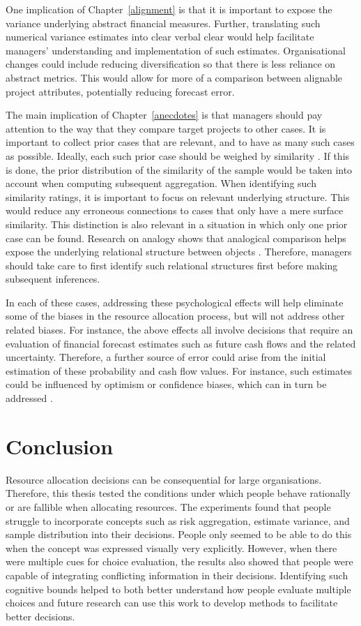 \documentclass[a4paper, nobind, dvipsnames]{templates/ociamthesis}
\theoremstyle{definition}
\theoremstyle{definition}
\theoremstyle{definition}
\theoremstyle{definition}
\theoremstyle{remark}
\begin{document}
One implication of Chapter~\ref{alignment} is that it is important to expose
the variance underlying abstract financial measures. Further, translating such
numerical variance estimates into clear verbal clear would help facilitate
managers' understanding and implementation of such estimates. Organisational
changes could include reducing diversification so that there is less reliance on
abstract metrics. This would allow for more of a comparison between alignable
project attributes, potentially reducing forecast error.

The main implication of Chapter~\ref{anecdotes} is that managers should pay
attention to the way that they compare target projects to other cases. It is
important to collect prior cases that are relevant, and to have as many such
cases as possible. Ideally, each such prior case should be weighed by similarity
\autocite{lovallo2012}. If this is done, the prior distribution of the similarity of the
sample would be taken into account when computing subsequent aggregation. When
identifying such similarity ratings, it is important to focus on relevant
underlying structure. This would reduce any erroneous connections to cases that
only have a mere surface similarity. This distinction is also relevant in a
situation in which only one prior case can be found. Research on analogy shows
that analogical comparison helps expose the underlying relational structure
between objects \autocites[e.g.,][]{kurtz2013,markman1993}. Therefore, managers should
take care to first identify such relational structures first before making
subsequent inferences.

In each of these cases, addressing these psychological effects will help
eliminate some of the biases in the resource allocation process, but will not
address other related biases. For instance, the above effects all involve
decisions that require an evaluation of financial forecast estimates such as
future cash flows and the related uncertainty. Therefore, a further source of
error could arise from the initial estimation of these probability and cash flow
values. For instance, such estimates could be influenced by optimism or
confidence biases, which can in turn be addressed \autocite{flyvbjerg2018}.

\section{Conclusion}

Resource allocation decisions can be consequential for large organisations.
Therefore, this thesis tested the conditions under which people behave
rationally or are fallible when allocating resources. The experiments found that
people struggle to incorporate concepts such as risk aggregation, estimate
variance, and sample distribution into their decisions. People only seemed to be
able to do this when the concept was expressed visually very explicitly.
However, when there were multiple cues for choice evaluation, the results also
showed that people were capable of integrating conflicting information in their
decisions. Identifying such cognitive bounds helped to both better understand
how people evaluate multiple choices and future research can use this work to
develop methods to facilitate better decisions.
\end{document}

